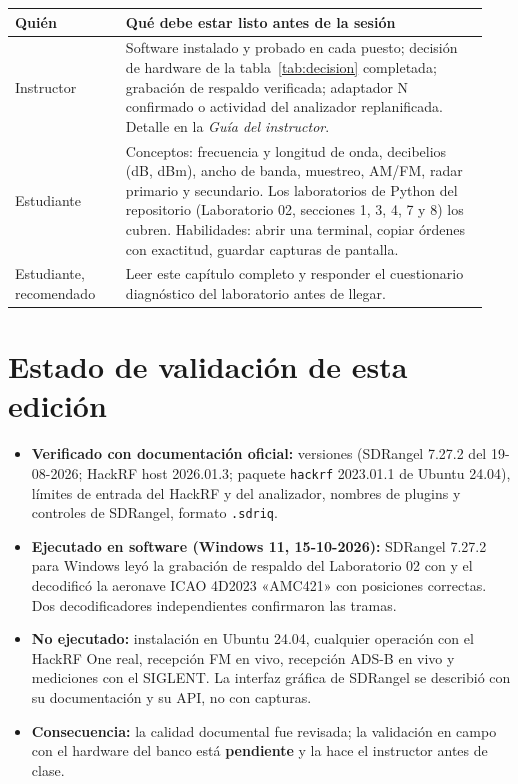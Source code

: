 \begin{longtable}{@{}>{\raggedright\arraybackslash}p{0.22\linewidth}>{\raggedright\arraybackslash}p{0.72\linewidth}@{}}
\toprule
\textbf{Quién} & \textbf{Qué debe estar listo antes de la sesión} \\
\midrule
\endhead
Instructor & Software instalado y probado en cada puesto; decisión de hardware de la tabla~\ref{tab:decision} completada; grabación de respaldo verificada; adaptador N confirmado o actividad del analizador replanificada. Detalle en la \emph{Guía del instructor}. \\
Estudiante & Conceptos: frecuencia y longitud de onda, decibelios (dB, dBm), ancho de banda, muestreo, AM/FM, radar primario y secundario. Los laboratorios de Python del repositorio (Laboratorio 02, secciones 1, 3, 4, 7 y 8) los cubren. Habilidades: abrir una terminal, copiar órdenes con exactitud, guardar capturas de pantalla. \\
Estudiante, recomendado & Leer este capítulo completo y responder el cuestionario diagnóstico del laboratorio antes de llegar. \\
\bottomrule
\end{longtable}

\section{Estado de validación de esta edición}
\label{sec:estado}

\begin{estado}
\begin{itemize}
  \item \textbf{Verificado con documentación oficial:} versiones (SDRangel 7.27.2 del 19-08-2026; HackRF host 2026.01.3; paquete \texttt{hackrf} 2023.01.1 de Ubuntu 24.04), límites de entrada del HackRF y del analizador, nombres de plugins y controles de SDRangel, formato \texttt{.sdriq}.
  \item \textbf{Ejecutado en software (Windows 11, 15-10-2026):} SDRangel 7.27.2 para Windows leyó la grabación de respaldo del Laboratorio 02 con  y el  decodificó la aeronave ICAO 4D2023 «AMC421» con posiciones correctas. Dos decodificadores independientes confirmaron las tramas.
  \item \textbf{No ejecutado:} instalación en Ubuntu 24.04, cualquier operación con el HackRF One real, recepción FM en vivo, recepción ADS-B en vivo y mediciones con el SIGLENT. La interfaz gráfica de SDRangel se describió con su documentación y su API, no con capturas.
  \item \textbf{Consecuencia:} la calidad documental fue revisada; la validación en campo con el hardware del banco está \textbf{pendiente} y la hace el instructor antes de clase.
\end{itemize}
\end{estado}
